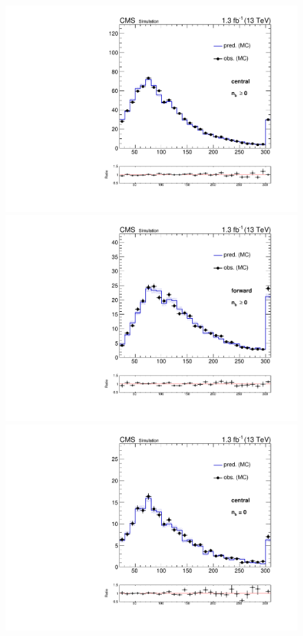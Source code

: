\begin{figure}[htb]
  \begin{center}
    \includegraphics[scale=0.25]{bkgd/figs/plot_results_mll_MCClosure_central_onlyTT_nbInc.pdf}
    \includegraphics[scale=0.25]{bkgd/figs/plot_results_mll_MCClosure_forward_onlyTT_nbInc.pdf}\\
    \includegraphics[scale=0.25]{bkgd/figs/plot_results_mll_MCClosure_central_onlyTT_nb0.pdf}

\end{center}
\end{figure}
